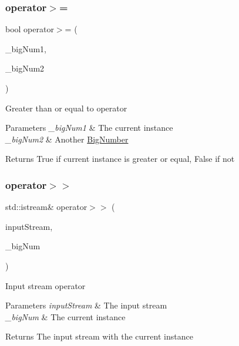 \subsubsection{\texorpdfstring{operator$>$=}{operator>=}}
{\footnotesize\ttfamily bool operator$>$= (\begin{DoxyParamCaption}\item[{const \mbox{\hyperlink{class_big_nums_1_1_big_number}{Big\+Number}} \&}]{\+\_\+big\+Num1,  }\item[{const \mbox{\hyperlink{class_big_nums_1_1_big_number}{Big\+Number}} \&}]{\+\_\+big\+Num2 }\end{DoxyParamCaption})\hspace{0.3cm}{\ttfamily [friend]}}

Greater than or equal to operator 
\begin{DoxyParams}{Parameters}
{\em \+\_\+big\+Num1} & The current instance \\
\hline
{\em \+\_\+big\+Num2} & Another \mbox{\hyperlink{class_big_nums_1_1_big_number}{Big\+Number}} \\
\hline
\end{DoxyParams}
\begin{DoxyReturn}{Returns}
True if current instance is greater or equal, False if not 
\end{DoxyReturn}
\mbox{\label{class_big_nums_1_1_big_number_adda5cd1a7aca6683ef84866af7e5bd0b}} 
\subsubsection{\texorpdfstring{operator$>$$>$}{operator>>}}
{\footnotesize\ttfamily std\+::istream\& operator$>$$>$ (\begin{DoxyParamCaption}\item[{std\+::istream \&}]{input\+Stream,  }\item[{\mbox{\hyperlink{class_big_nums_1_1_big_number}{Big\+Number}} \&}]{\+\_\+big\+Num }\end{DoxyParamCaption})\hspace{0.3cm}{\ttfamily [friend]}}

Input stream operator 
\begin{DoxyParams}{Parameters}
{\em input\+Stream} & The input stream \\
\hline
{\em \+\_\+big\+Num} & The current instance \\
\hline
\end{DoxyParams}
\begin{DoxyReturn}{Returns}
The input stream with the current instance 
\end{DoxyReturn}
\mbox{\label{class_big_nums_1_1_big_number_a20db44e73666375cb56579d951ef87c4}} 
